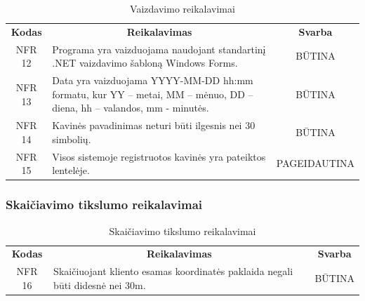 \documentclass{VUMIFPSkursinis}
\begin{document}
\begin{center}
	\begin{table}[H]
	\caption{Vaizdavimo reikalavimai}
	\begin{tabular}{|p{2cm}|p{}|p{}|}
	\hline
	    \rowcolor{lightgray}
		\multicolumn{3}{|c|}{Vaizdavimo reikalavimai}\\
		
	\hline
		\multicolumn{1}{|c|}{{\bfseries Kodas}}&
		\multicolumn{1}{|c|}{{\bfseries Reikalavimas}}&
		\multicolumn{1}{|c|}{{\bfseries Svarba}}\\
	\hline 	
		\multicolumn{1}{|c|}{NFR 12}&
		{Programa yra vaizduojama naudojant standartinį .NET vaizdavimo šabloną Windows Forms.}&
		\multicolumn{1}{|c|}{BŪTINA}\\	
	
	\hline 	
		\multicolumn{1}{|c|}{NFR 13}&
		{Data yra vaizduojama YYYY-MM-DD hh:mm formatu, kur YY – metai, MM – mėnuo, DD – diena, hh – valandos, mm - minutės.}&
		\multicolumn{1}{|c|}{BŪTINA}\\	
	
	\hline 	
		\multicolumn{1}{|c|}{NFR 14}&
		{Kavinės pavadinimas neturi būti ilgesnis nei 30 simbolių.}&
		\multicolumn{1}{|c|}{BŪTINA}\\	
	
	\hline  	
		\multicolumn{1}{|c|}{NFR 15}&
		{Visos sistemoje registruotos kavinės yra pateiktos lentelėje.}&
		\multicolumn{1}{|p{1.5cm}|}{PAGEIDAUTINA}\\		
	
	\hline 	 	 	
	\end{tabular}
	
	\label{table:Vaizdavimoreikalavimai}
	\end{table}

\end{center}

\subsubsection{Skaičiavimo tikslumo reikalavimai}

\begin{center}
	\begin{table}[H]
	\caption{Skaičiavimo tikslumo reikalavimai}
	\begin{tabular}{|p{2cm}|p{}|p{}|}
	\hline
	    \rowcolor{lightgray}
		\multicolumn{3}{|c|}{Skaičiavimo tikslumo reikalavimai}\\
		
	\hline
		\multicolumn{1}{|c|}{{\bfseries Kodas}}&
		\multicolumn{1}{|c|}{{\bfseries Reikalavimas}}&
		\multicolumn{1}{|c|}{{\bfseries Svarba}}\\
	\hline 	
		\multicolumn{1}{|c|}{NFR 16}&
		{Skaičiuojant kliento esamas koordinatės paklaida negali būti didesnė nei 30m.}&
		\multicolumn{1}{|c|}{BŪTINA}\\	
	\hline 	 	 	
	\end{tabular}
	
	\label{table:Skaičiavimotikslumoreikalavimai}
	\end{table}

\end{center}
\end{document}
